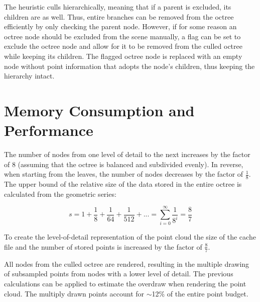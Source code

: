 \par

The heuristic culls hierarchically, meaning that if a parent is excluded, its children are as well. Thus, entire branches can be removed from the octree efficiently by only checking the parent node. However, if for some reason an octree node should be excluded from the scene manually, a flag can be set to exclude the octree node and allow for it to be removed from the culled octree while keeping its children. The flagged octree node is replaced with an empty node without point information that adopts the node's children, thus keeping the hierarchy intact. 


\section{Memory Consumption and Performance}
\label{sec:octree_memory}
The number of nodes from one level of detail to the next increases by the factor of $8$ (assuming that the octree is balanced and subdivided evenly). In reverse, when starting from the leaves, the number of nodes decreases by the factor of $\frac{1}{8}$. The upper bound of the relative size of the data stored in the entire octree is calculated from the geometric series: 


$$s = 1 + \frac{1}{8} + \frac{1}{64} + \frac{1}{512} + ... = \sum_{i = 0}^{\infty}{\frac{1}{8^i}} = \frac{8}{7}$$


To create the level-of-detail representation of the point cloud the size of the cache file and the number of stored points is increased by the factor of $\frac{8}{7}$. 

\par

All nodes from the culled octree are rendered, resulting in the multiple drawing of subsampled points from nodes with a lower level of detail. The previous calculations can be applied to estimate the overdraw when rendering the point cloud. The multiply drawn points account for $\sim$12\% of the entire point budget.